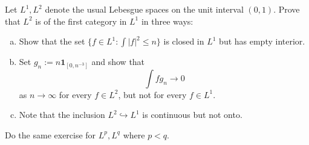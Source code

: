 \begin{exercise}[Rudin Ex.\ 2.4]
	Let $L^1, L^2$ denote the usual Lebesgue spaces on the unit interval $(0,1)$. Prove that $L^2$ is of the first category in $L^1$ in three ways:
	\begin{enumerate}[(a)]
		\item Show that the set $\{ f\in L^1 : \int |f|^2 \le n\}$ is closed in $L^1$ but has empty interior.
		\item Set $g_n := n \mathbf{1}_{[0, n^{-3}]}$ and show that
		\begin{equation*}
			\int fg_n \longrightarrow 0
		\end{equation*}
		as $n \to \infty$ for every $f\in L^2$, but not for every $f\in L^1$.
		\item Note that the inclusion $L^2 \hookrightarrow L^1$ is continuous but not onto.
	\end{enumerate}
	Do the same exercise for $L^p, L^q$ where $p<q$.
\end{exercise}

